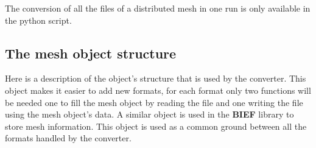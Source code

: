 \documentclass[a4paper,10pt]{article}
\newcommand{\bief}{\textbf{BIEF}\xspace}
\begin{document}
The conversion of all the files of a distributed mesh in one run is only
available in the python script.

\subsection{The mesh object structure}

Here is a description of the object's structure that is used by the converter.
This object makes it easier to add new formats, for each format only two
functions will be needed one to fill the mesh object by reading the file and
one writing the file using the mesh object's data.  A similar object is used in
the \bief library to store mesh information.  This object is used as a common
ground between all the formats handled by the converter.
\end{document}
